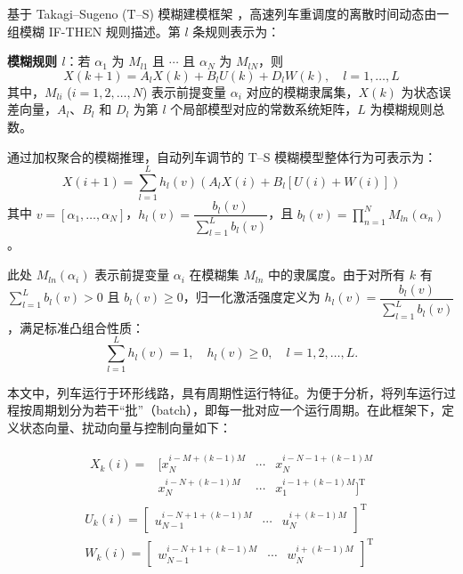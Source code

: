 基于 Takagi–Sugeno (T–S) 模糊建模框架 \cite{Tanaka1992}，高速列车重调度的离散时间动态由一组模糊 IF-THEN 规则描述。第 $l$ 条规则表示为：

\textbf{模糊规则 $l$}：若 $\alpha_1$ 为 $M_{l1}$ 且 $\cdots$ 且 $\alpha_N$ 为 $M_{lN}$，则
\begin{equation}
X(k+1) = A_l X(k) + B_l U(k) + D_l W(k), \quad l=1,\ldots,L
\end{equation}
其中，$M_{li}$ ($i=1,2,\ldots,N$) 表示前提变量 $\alpha_i$ 对应的模糊隶属集，$X(k)$ 为状态误差向量，$A_l$、$B_l$ 和 $D_l$ 为第 $l$ 个局部模型对应的常数系统矩阵，$L$ 为模糊规则总数。

通过加权聚合的模糊推理，自动列车调节的 T–S 模糊模型整体行为可表示为：
\begin{equation}
X(i+1) = \sum_{l=1}^{L} h_l(v) \left( A_l X(i) + B_l [U(i) + W(i) ]\right)
\end{equation}
其中 $v = [\alpha_1, \ldots, \alpha_N]$，$h_l(v) = \dfrac{b_l(v)}{\sum_{l=1}^{L} b_l(v)}$，且 $b_l(v) = \prod_{n=1}^{N} M_{ln}(\alpha_n)$。

此处 $M_{ln}(\alpha_i)$ 表示前提变量 $\alpha_i$ 在模糊集 $M_{ln}$ 中的隶属度。由于对所有 $k$ 有 $\sum_{l=1}^{L} b_l(v) > 0$ 且 $b_l(v) \geq 0$，归一化激活强度定义为 $h_l(v) = \dfrac{b_l(v)}{\sum_{l=1}^{L} b_l(v)}$，满足标准凸组合性质：
\[
\sum_{l=1}^{L} h_l(v) = 1, \quad h_l(v) \geq 0, \quad l=1,2,\ldots,L.
\]

本文中，列车运行于环形线路，具有周期性运行特征。为便于分析，将列车运行过程按周期划分为若干“批”（batch），即每一批对应一个运行周期。在此框架下，定义状态向量、扰动向量与控制向量如下：

\begin{equation}
\begin{gathered}
\begin{array}{llll}
X_k(i)=&[x_N^{i-M+(k-1) M} & \cdots & x_N^{i-N-1+(k-1) M}\\
&x_N^{i-N+(k-1) M} & \cdots & x_1^{i-1+(k-1) M}]^{\mathrm{T}}
\end{array} \\
U_k(i)=\left[\begin{array}{lll}
u_{N-1}^{i-N+1+(k-1) M} & \cdots & u_N^{i+(k-1) M}
\end{array}\right]^{\mathrm{T}} \\
W_k(i)=\left[\begin{array}{lll}
w_{N-1}^{i-N+1+(k-1) M} & \cdots & w_N^{i+(k-1) M}
\end{array}\right]^{\mathrm{T}}
\end{gathered}
\label{eq13}
\end{equation}

